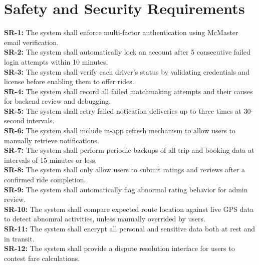 \documentclass{article}
\begin{document}
\section{Safety and Security Requirements}

\noindent \textbf{SR-1:} The system shall enforce multi-factor authentication using McMaster email verification. \\

\noindent \textbf{SR-2:} The system shall automatically lock an account after 5 consecutive failed login attempts within 10 minutes. \\

\noindent \textbf{SR-3:} The system shall verify each driver's status by validating credentials and license before enabling them to offer rides. \\

\noindent \textbf{SR-4:} The system shall record all failed matchmaking attempts and their causes for backend review and debugging. \\

\noindent \textbf{SR-5:} The system shall retry failed notication deliveries up to three times at 30-second intervals. \\

\noindent \textbf{SR-6:} The system shall include in-app refresh mechanism to allow users to manually retrieve notifications. \\

\noindent \textbf{SR-7:} The system shall perform periodic backups of all trip and booking data at intervals of 15 minutes or less. \\

\noindent \textbf{SR-8:} The system shall only allow users to submit ratings and reviews after a confirmed ride completion. \\

\noindent \textbf{SR-9:} The system shall automatically flag abnormal rating behavior for admin review. \\

\noindent \textbf{SR-10:} The system shall compare expected route location against live GPS data to detect abnomral activities, unless manually overrided by users. \\

\noindent \textbf{SR-11:} The system shall encrypt all personal and sensitive data both at rest and in transit.\\

\noindent \textbf{SR-12:} The system shall provide a dispute resolution interface for users to contest fare calculations. \\
\end{document}

